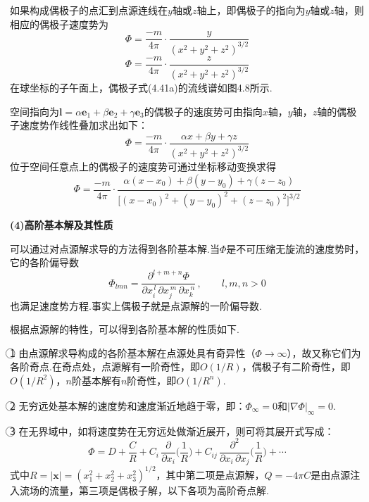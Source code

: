 如果构成偶极子的点汇到点源连线在$y$轴或$z$轴上，即偶极子的指向为$y$轴或$z$轴，则相应的偶极子速度势为
\begin{equation*}
\Phi=\frac{-m}{4\pi}\cdot\frac{y}{(x^{2}+y^{2}+z^{2})^{3/2}}
\tag{4.41b}
\end{equation*}
\begin{equation*}
\Phi=\frac{-m}{4\pi}\cdot\frac{z}{(x^{2}+y^{2}+z^{2})^{3/2}}
\tag{4.41c}
\end{equation*}
在球坐标的子午面上，偶极子式(4.41a)的流线谱如图4.8所示.

空间指向为$\boldsymbol{l}=\alpha\boldsymbol{e}_1+\beta\boldsymbol{e}_2+\gamma\boldsymbol{e}_3$的偶极子的速度势可由指向$x$轴，$y$轴，$z$轴的偶极子速度势作线性叠加求出如下：
\begin{equation*}
\Phi=\frac{-m}{4\pi}\cdot\frac{\alpha x+\beta y+\gamma z}{(x^{2}+y^{2}+z^{2})^{3/2}}
\tag{4.41d}
\end{equation*}
位于空间任意点上的偶极子的速度势可通过坐标移动变换求得
\begin{equation*}
\Phi=\frac{-m}{4\pi}\cdot\frac{\alpha(x-x_0)+\beta(y-y_0)+\gamma(z-z_0)}{\big[(x-x_0)^{2}+(y-y_0)^{2}+(z-z_0)^{2}\big]^{3/2}}
\tag{4.41e}
\end{equation*}

\textbf{(4)高阶基本解及其性质}

可以通过对点源解求导的方法得到各阶基本解.当$\Phi$是不可压缩无旋流的速度势时，它的各阶偏导数
\begin{equation*}
\Phi_{lmn}=\frac{\partial^{l+m+n}\Phi}{\partial x_i^{\,l}\,\partial x_j^{\,m}\,\partial x_k^{\,n}}\,,\qquad l,m,n>0
\tag{4.42}
\end{equation*}
也满足速度势方程.事实上偶极子就是点源解的一阶偏导数.

根据点源解的特性，可以得到各阶基本解的性质如下.

\textcircled{1} 由点源解求导构成的各阶基本解在点源处具有奇异性（$\Phi\to\infty$），故又称它们为各阶奇点.在奇点处，点源解有一阶奇性，即$O(1/R)$，偶极子有二阶奇性，即$O(1/R^{2})$，$n$阶基本解有$n$阶奇性，即$O(1/R^{n})$.

\textcircled{2} 无穷远处基本解的速度势和速度渐近地趋于零，即：$\Phi_\infty=0$和$|\nabla\Phi|_\infty=0$.

\textcircled{3} 在无界域中，如将速度势在无穷远处做渐近展开，则可将其展开式写成：
\[
\Phi=D+\frac{C}{R}+C_i\,\frac{\partial}{\partial x_i}\Big(\frac{1}{R}\Big)+C_{ij}\,\frac{\partial^{2}}{\partial x_i\,\partial x_j}\Big(\frac{1}{R}\Big)+\cdots
\]
式中$R=|\boldsymbol{x}|=(x_1^{2}+x_2^{2}+x_3^{2})^{1/2}$，其中第二项是点源解，$Q=-4\pi C$是由点源注入流场的流量，第三项是偶极子解，以下各项为高阶奇点解.

